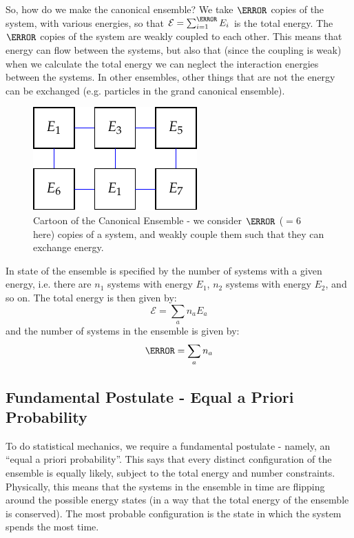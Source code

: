 So, how do we make the canonical ensemble? We take $\N$ copies of the system, with various energies, so that $\mathcal{E} = \sum_{i=1}^{\N} E_i$ is the total energy. The $\N$ copies of the system are weakly coupled to each other. This means that energy can flow between the systems, but also that (since the coupling is weak) when we calculate the total energy we can neglect the interaction energies between the systems. In other ensembles, other things that are not the energy can be exchanged (e.g. particles in the grand canonical ensemble).

\begin{figure}[htbp]
    \centering
    \includegraphics[]{Images/fig-canonicalensemble.pdf}
    
    \caption{Cartoon of the Canonical Ensemble - we consider $\N$ ($= 6$ here) copies of a system, and weakly couple them such that they can exchange energy.}
    \label{fig-canonicalensemble}
\end{figure}

In state of the ensemble is specified by the number of systems with a given energy, i.e. there are $n_1$ systems with energy $E_1$, $n_2$ systems with energy $E_2$, and so on. The total energy is then given by:
\begin{equation}
    \mathcal{E} = \sum_{a} n_a E_a
\end{equation}
and the number of systems in the ensemble is given by:
\begin{equation}
    \N = \sum_a n_a
\end{equation}

\subsection{Fundamental Postulate - Equal a Priori Probability}
To do statistical mechanics, we require a fundamental postulate - namely, an ``equal a priori probability''. This says that every distinct configuration of the ensemble is equally likely, subject to the total energy and number constraints. Physically, this means that the systems in the ensemble in time are flipping around the possible energy states (in a way that the total energy of the ensemble is conserved). The most probable configuration is the state in which the system spends the most time.

